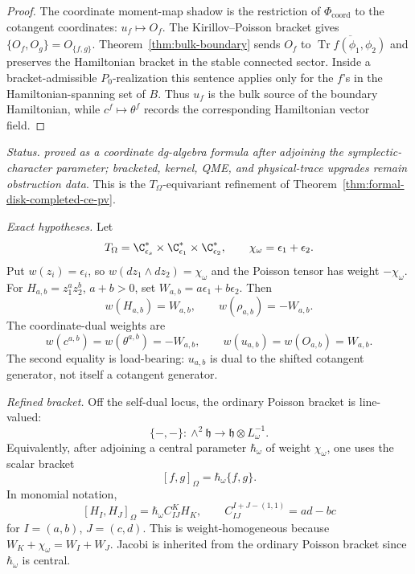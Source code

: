 \begin{proof}
		  The coordinate moment-map shadow is the restriction of
	  \(\Phi_{\mathrm{coord}}\) to the cotangent
  coordinates: \(u_f\mapsto O_f\).  The Kirillov--Poisson bracket gives
  \(\{O_f,O_g\}=O_{\{f,g\}}\).  Theorem~\ref{thm:bulk-boundary} sends
  \(O_f\) to
  \(\overline{\operatorname{Tr}f(\phi_1,\phi_2)}\) and preserves the
  Hamiltonian bracket in the stable connected sector.  Inside a
  bracket-admissible \(P_0\)-realization this sentence applies only for
  the \(f\)'s in the Hamiltonian-spanning set of \(B\).  Thus \(u_f\) is
  the bulk source of the boundary Hamiltonian, while \(c^f\mapsto\theta^f\)
  records the corresponding Hamiltonian vector field.
\end{proof}

\begin{stmt}\label{thm:lane-equivariant-ce-pv-refined-bracket}
  \emph{Status.} \emph{proved as a coordinate dg-algebra formula after
  adjoining the symplectic-character parameter; bracketed, kernel, QME,
  and physical-trace upgrades remain obstruction data}.  This is the
  \(T_\Omega\)-equivariant refinement of
  Theorem~\ref{thm:formal-disk-completed-ce-pv}.

  \emph{Exact hypotheses.} Let
  \[
    T_\Omega=\C^*_{\epsilon_s}\times
    \C^*_{\epsilon_1}\times\C^*_{\epsilon_2},
    \qquad
    \chi_\omega=\epsilon_1+\epsilon_2 .
  \]
  Put \(w(z_i)=\epsilon_i\), so
  \(w(dz_1\wedge dz_2)=\chi_\omega\) and the Poisson tensor has weight
  \(-\chi_\omega\).  For \(H_{a,b}=z_1^az_2^b\), \(a+b>0\), set
  \(W_{a,b}=a\epsilon_1+b\epsilon_2\).  Then
  \[
    w(H_{a,b})=W_{a,b},\qquad
    w(\rho_{a,b})=-W_{a,b}.
  \]
  The coordinate-dual weights are
  \[
    w(c^{a,b})=w(\theta^{a,b})=-W_{a,b},
    \qquad
    w(u_{a,b})=w(O_{a,b})=W_{a,b}.
  \]
  The second equality is load-bearing: \(u_{a,b}\) is dual to the
  shifted cotangent generator, not itself a cotangent generator.

  \emph{Refined bracket.} Off the self-dual locus, the ordinary Poisson
  bracket is line-valued:
  \[
    \{-,-\}\colon
    \wedge^2\mathfrak h\longrightarrow
    \mathfrak h\otimes L_\omega^{-1}.
  \]
  Equivalently, after adjoining a central parameter
  \(\hbar_\omega\) of weight \(\chi_\omega\), one uses the scalar
  bracket
  \[
    [f,g]_\Omega=\hbar_\omega\{f,g\}.
  \]
  In monomial notation,
  \[
    [H_I,H_J]_\Omega
    =
    \hbar_\omega C^K_{IJ}H_K,
    \qquad
    C^{I+J-(1,1)}_{IJ}=ad-bc
  \]
  for \(I=(a,b)\), \(J=(c,d)\).  This is weight-homogeneous because
  \(W_K+\chi_\omega=W_I+W_J\).  Jacobi is inherited from the ordinary
  Poisson bracket since \(\hbar_\omega\) is central.


\end{stmt}
